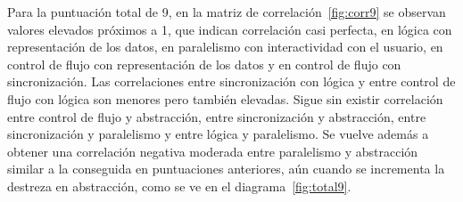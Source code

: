 \documentclass[a4paper, 12pt]{book}
\begin{document}
Para la puntuación total de 9, en la matriz de correlación~\ref{fig:corr9} se observan valores elevados próximos a 1, que indican correlación casi perfecta, en lógica con representación de los datos, en paralelismo con interactividad con el usuario, en control de flujo con representación de los datos y en control de flujo con sincronización. Las correlaciones entre sincronización con lógica y entre control de flujo con lógica son menores pero también elevadas. Sigue sin existir correlación entre control de flujo y abstracción, entre sincronización y abstracción, entre sincronización y paralelismo y entre lógica y paralelismo. Se vuelve además a obtener una correlación negativa moderada entre paralelismo y abstracción similar a la conseguida en puntuaciones anteriores, aún cuando se incrementa la destreza en abstracción, como se ve en el diagrama~\ref{fig:total9}.
\end{document}
